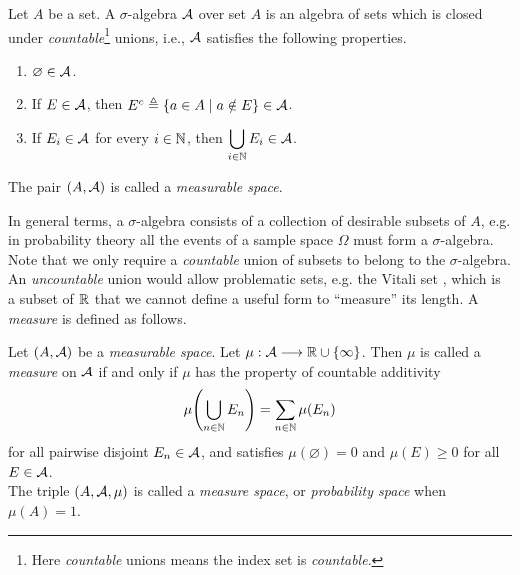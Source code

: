 \begin{definition}
    Let $A$ be a set.
    A $\sigma$-algebra $\cal{A}$ over set $A$ is an algebra of sets which is closed under \textit{countable}\footnote{%
    Here \textit{countable} unions means the index set is \textit{countable}.} unions, i.e., $\cal{A}$ satisfies the following properties.
    \begin{enumerate}[label=(\alph*), noitemsep]
        \item $\varnothing\in\cal A$.
        \item If $E\in\cal A$, then $E^c\triangleq\{a\in A\mid a\notin E\}\in\cal A$.
        \item If $E_i\in\cal A$ for every $i\in\N$, then $\displaystyle\bigcup_{i\in\N} E_i\in\cal A$.
    \end{enumerate}
    The pair $(A,\cal{A})$ is called a \textit{measurable space}.
\end{definition}

In general terms, a $\sigma$-algebra consists of a collection of desirable subsets of $A$, e.g. in probability theory all the events of a sample space $\Omega$ must form a $\sigma$-algebra.
%
Note that we only require a \textit{countable} union of subsets to belong to the $\sigma$-algebra. An \textit{uncountable} union would allow problematic sets, e.g. the Vitali set \cite{vitali1905sul}, which is a subset of $\R$ that we cannot define a useful form to ``measure'' its length. A \textit{measure} is defined as follows.

\begin{definition}
    Let $(A,\cal{A})$ be a \textit{measurable space}.
    Let $\mu: \cal{A}\longrightarrow \R \cup \{\infty\}$. Then $\mu$ is called a \textit{measure} on $\cal{A}$ if and only if $\mu$ has the property of countable additivity
    \begin{align*}
        \mu\!\left(\bigcup_{n\in\N} E_n \right) = \sum_{n\in\N} \mu(E_n)
    \end{align*}
    for all pairwise disjoint $E_n \in\cal{A}$, and satisfies $\mu(\varnothing) = 0$ and $\mu(E) \ge 0$ for all $E \in \cal{A}$.\\
    The triple $(A,\cal{A},\mu)$ is called a \textit{measure space}, or \textit{probability space} when $\mu(A)=1$.
\end{definition}

